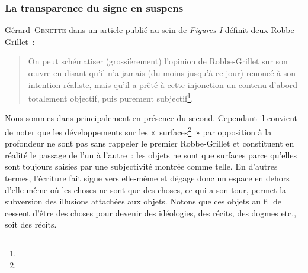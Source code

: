 \subsubsection{La transparence du signe en suspens}
\label{signe}

Gérard~\textsc{Genette} dans un article publié au sein de \textit{Figures I} définit deux Robbe-Grillet~:
\begin{quote}
    On peut schématiser (grossièrement) l'opinion de Robbe-Grillet sur son œuvre en disant qu'il n'a jamais (du moins jusqu'à ce jour) renoncé à son intention réaliste, mais qu'il a prêté à cette injonction un contenu d'abord totalement objectif, puis purement subjectif\footnote{}.
\end{quote}
Nous sommes dans \punr{} principalement en présence du second. Cependant il convient de noter que les développements sur les «~surfaces\footnote{}~» par opposition à la profondeur ne sont pas sans rappeler le premier Robbe-Grillet et constituent en réalité le passage de l'un à l'autre~: les objets ne sont que surfaces parce qu'elles sont toujours saisies par une subjectivité montrée comme telle. En d'autres termes, l'écriture fait signe vers elle-même et dégage donc un espace en dehors d'elle-même où les choses ne sont que des choses, ce qui a son tour, permet la subversion des illusions attachées aux objets. Notons que ces objets au fil de \punr{} cessent d'être des choses pour devenir des idéologies, des récits, des dogmes etc., soit des récits.

